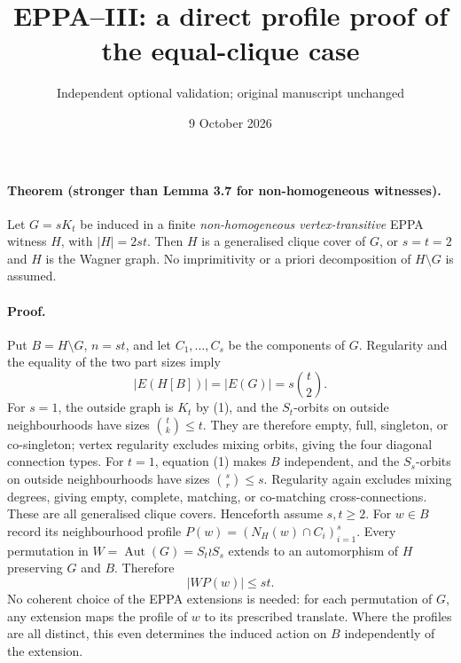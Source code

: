 \documentclass[11pt,a4paper]{article}
\title{EPPA--III: a direct profile proof of the equal-clique case}
\author{Independent optional validation; original manuscript unchanged}
\date{9 October 2026}
\begin{document}
\maketitle

\paragraph{Theorem (stronger than Lemma 3.7 for
non-homogeneous witnesses).}
Let \(G=sK_t\) be induced in a finite
\emph{non-homogeneous vertex-transitive}
EPPA witness \(H\), with \(|H|=2st\).
Then \(H\) is a generalised clique cover
of \(G\), or \(s=t=2\) and \(H\) is
the Wagner graph. No imprimitivity or
a priori decomposition of \(H\setminus G\)
is assumed.

\paragraph{Proof.}
Put \(B=H\setminus G\), \(n=st\), and
let \(C_1,\ldots,C_s\) be the components
of \(G\). Regularity and the equality of
the two part sizes imply
\[
             |E(H[B])|=|E(G)|=s\binom t2.
             \tag{1}
\]
For \(s=1\), the outside graph is \(K_t\) by
(1), and the \(S_t\)-orbits on outside
neighbourhoods have sizes \(\binom tk\le t\).
They are therefore empty, full, singleton,
or co-singleton; vertex regularity excludes
mixing orbits, giving the four diagonal
connection types. For \(t=1\), equation (1)
makes \(B\) independent, and the \(S_s\)-orbits
on outside neighbourhoods have sizes
\(\binom sr\le s\). Regularity again excludes
mixing degrees, giving empty, complete,
matching, or co-matching cross-connections.
These are all generalised clique covers.
Henceforth assume \(s,t\ge2\).
For \(w\in B\) record its neighbourhood
profile \(P(w)=(N_H(w)\cap C_i)_{i=1}^s\).
Every permutation in
\(W=\operatorname{Aut}(G)=S_t\wr S_s\)
extends to an automorphism of \(H\)
preserving \(G\) and \(B\). Therefore
\[
                      |W P(w)|\le st.
                      \tag{2}
\]
No coherent choice of the EPPA extensions is needed:
for each permutation of \(G\), any extension maps the
profile of \(w\) to its prescribed translate. Where the
profiles are all distinct, this even determines the
induced action on \(B\) independently of the extension.
\end{document}
